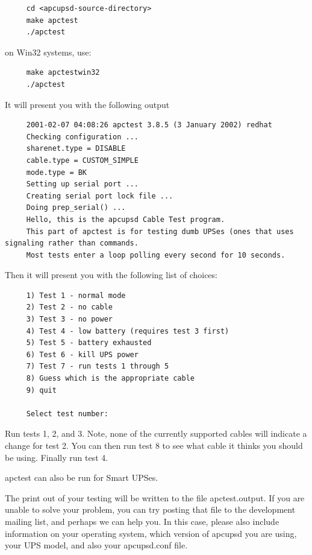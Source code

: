 {{{{{{{\footnotesize
\begin{verbatim}
     cd <apcupsd-source-directory>
     make apctest
     ./apctest
\end{verbatim}
\normalsize

on Win32 systems, use: 

\footnotesize
\begin{verbatim}
     make apctestwin32
     ./apctest
\end{verbatim}
\normalsize

It will present you with the following output 

\footnotesize
\begin{verbatim}
     2001-02-07 04:08:26 apctest 3.8.5 (3 January 2002) redhat
     Checking configuration ...
     sharenet.type = DISABLE
     cable.type = CUSTOM_SIMPLE
     mode.type = BK
     Setting up serial port ...
     Creating serial port lock file ...
     Doing prep_serial() ...
     Hello, this is the apcupsd Cable Test program.
     This part of apctest is for testing dumb UPSes (ones that uses signaling rather than commands.
     Most tests enter a loop polling every second for 10 seconds.
\end{verbatim}
\normalsize

Then it will present you with the following list of choices: 

\footnotesize
\begin{verbatim}
     1) Test 1 - normal mode
     2) Test 2 - no cable
     3) Test 3 - no power
     4) Test 4 - low battery (requires test 3 first)
     5) Test 5 - battery exhausted
     6) Test 6 - kill UPS power
     7) Test 7 - run tests 1 through 5
     8) Guess which is the appropriate cable
     9) quit
     
     Select test number:
\end{verbatim}
\normalsize

Run tests 1, 2, and 3. Note, none of the currently supported cables will
indicate a change for test 2. You can then run test 8 to see what cable it
thinks you should be using. Finally run test 4.  

apctest can also be run for Smart UPSes.  

The print out of your testing will be written to the file apctest.output. If
you are unable to solve your problem, you can try posting that file to the
development mailing list, and perhaps we can help you. In this case, please
also include information on your operating system, which version of apcupsd
you are using, your UPS model, and also your apcupsd.conf file. 

}}}}}}}
